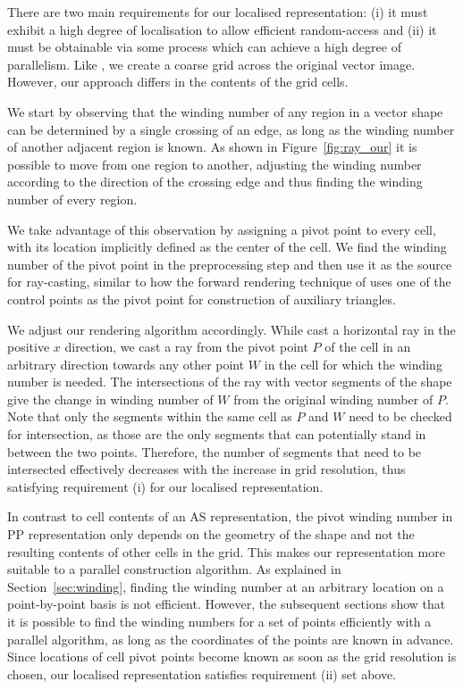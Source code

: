 \documentclass[11pt,a4paper,twoside]{article}
\begin{document}
There are two main requirements for our localised representation: (i) it must exhibit a high degree of localisation to allow efficient random-access and (ii) it must be obtainable via some process which can achieve a high degree of parallelism. Like \cite{NehabHoppe08}, we create a coarse grid across the original vector image. However, our approach differs in the contents of the grid cells. 

We start by observing that the winding number of any region in a vector shape can be determined by a single crossing of an edge, as long as the winding number of another adjacent region is known. As shown in Figure~\ref{fig:ray_our} it is possible to move from one region to another, adjusting the winding number according to the direction of the crossing edge and thus finding the winding number of every region.

We take advantage of this observation by assigning a pivot point to every cell, with its location implicitly defined as the center of the cell. We find the winding number of the pivot point in the preprocessing step and then use it as the source for ray-casting, similar to how the forward rendering technique of \cite{Kokojima06} uses one of the control points as the pivot point for construction of auxiliary triangles.

We adjust our rendering algorithm accordingly. While \cite{NehabHoppe08} cast a horizontal ray in the positive $x$ direction, we cast a ray from the pivot point $P$ of the cell in an arbitrary direction towards any other point $W$ in the cell for which the winding number is needed. The intersections of the ray with vector segments of the shape give the change in winding number of $W$ from the original winding number of $P$. Note that only the segments within the same cell as $P$ and $W$ need to be checked for intersection, as those are the only segments that can potentially stand in between the two points. Therefore, the number of segments that need to be intersected effectively decreases with the increase in grid resolution, thus satisfying requirement (i) for our localised representation.

In contrast to cell contents of an AS representation, the pivot winding number in PP representation only depends on the geometry of the shape and not the resulting contents of other cells in the grid. This makes our representation more suitable to a parallel construction algorithm. As explained in Section~\ref{sec:winding}, finding the winding number at an arbitrary location on a point-by-point basis is not efficient. However, the subsequent sections show that it is possible to find the winding numbers for a set of points efficiently with a parallel algorithm, as long as the coordinates of the points are known in advance. Since locations of cell pivot points become known as soon as the grid resolution is chosen, our localised representation satisfies requirement (ii) set above.
\end{document}
